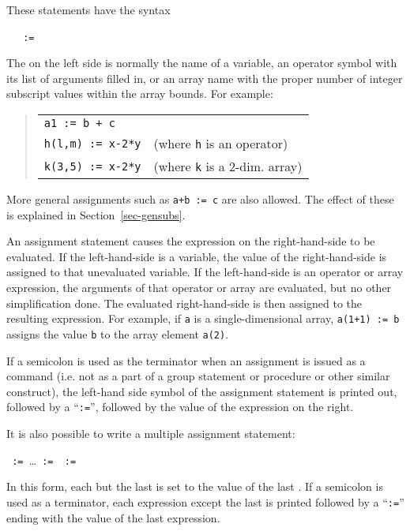\label{reserved:assignop}

These statements
 have the syntax
\begin{syntax}
  \ \BNFprod\ \texttt{ := }
\end{syntax}
The  on the left side is normally the name of a variable, an
operator symbol with its list of arguments filled in, or an array name with
the proper number of integer subscript values within the array bounds. For
example:
\begin{quote}
\begin{tabular}{ll}
\texttt{a1 := b + c} \\
\texttt{h(l,m) := x-2*y} \hspace{1in} & (where \texttt{h} is an operator) \\
\texttt{k(3,5) := x-2*y}              & (where \texttt{k} is a 2-dim. array)
\end{tabular}
\end{quote}
More general assignments such as \texttt{a+b := c} are also
allowed.  The effect of these is explained in Section~\ref{sec-gensubs}.

An assignment statement causes the expression on the right-hand-side to be
evaluated.  If the left-hand-side is a variable, the value of the
right-hand-side is assigned to that unevaluated variable.  If the
left-hand-side is an operator or array expression, the arguments of that
operator or array are evaluated, but no other simplification done.  The
evaluated right-hand-side is then assigned to the resulting expression.
For example, if \texttt{a} is a single-dimensional array, \texttt{a(1+1) := b}
assigns the value \texttt{b} to the array element \texttt{a(2)}.

If a semicolon is used as the terminator when an assignment
 is issued as a command (i.e. not as a part of a group
statement or procedure or other similar construct), the left-hand side
symbol of the assignment statement is printed out, followed by a
``\texttt{:=}'', followed by the value of the expression on the right.

It is also possible to write a multiple assignment statement:
\begin{syntax}
  \texttt{ := }\dots\texttt{ :=
  }\texttt{ := }
\end{syntax}
In this form, each  but the last is set to the value of
the last .  If a semicolon is used as a terminator, each
expression except the last is printed followed by a ``\texttt{:=}'' ending
with the value of the last expression.


